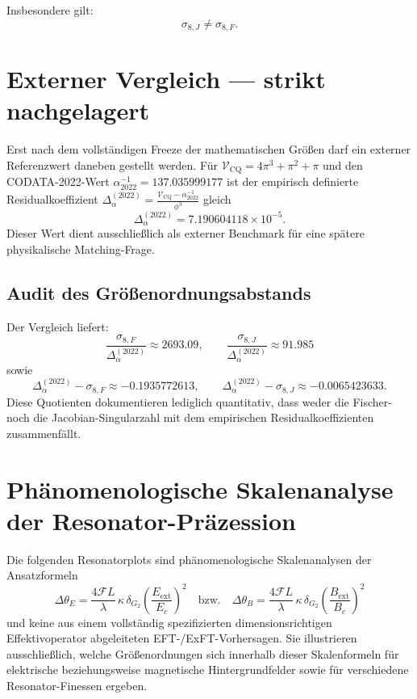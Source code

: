 \documentclass[11pt,a4paper]{article}
\begin{document}
Insbesondere gilt:
$$\boxed{ \sigma_{8,J} \neq \sigma_{8,F}. }$$

\section{Externer Vergleich — strikt nachgelagert}

Erst nach dem vollständigen Freeze der mathematischen Größen darf ein externer Referenzwert daneben gestellt werden. Für $\mathcal{V}_{\mathrm{CQ}} = 4\pi^3 + \pi^2 + \pi$ und den CODATA-2022-Wert $\alpha_{2022}^{-1} = 137.035999177$ ist der empirisch definierte Residualkoeffizient $\Delta_\alpha^{(2022)} = \frac{\mathcal{V}_{\mathrm{CQ}} - \alpha_{2022}^{-1}}{\phi^3}$ gleich
$$\boxed{ \Delta_\alpha^{(2022)} = 7.190604118 \times 10^{-5}. }$$
Dieser Wert dient ausschließlich als externer Benchmark für eine spätere physikalische Matching-Frage.

\subsection*{Audit des Größenordnungsabstands}
Der Vergleich liefert:
$$\frac{\sigma_{8,F}}{\Delta_\alpha^{(2022)}} \approx 2693.09, \qquad \frac{\sigma_{8,J}}{\Delta_\alpha^{(2022)}} \approx 91.985$$
sowie
$$\Delta_\alpha^{(2022)} - \sigma_{8,F} \approx -0.1935772613, \qquad \Delta_\alpha^{(2022)} - \sigma_{8,J} \approx -0.0065423633.$$
Diese Quotienten dokumentieren lediglich quantitativ, dass weder die Fischer- noch die Jacobian-Singularzahl mit dem empirischen Residualkoeffizienten zusammenfällt.

\section{Phänomenologische Skalenanalyse der Resonator-Präzession}

Die folgenden Resonatorplots sind phänomenologische Skalenanalysen der Ansatzformeln
$$\Delta\theta_E = \frac{4\mathcal{F}L}{\lambda} \, \kappa \, \delta_{G_2} \left(\frac{E_{\text{ext}}}{E_c}\right)^2 \quad \text{bzw.} \quad \Delta\theta_B = \frac{4\mathcal{F}L}{\lambda} \, \kappa \, \delta_{G_2} \left(\frac{B_{\text{ext}}}{B_c}\right)^2$$
und keine aus einem vollständig spezifizierten dimensionsrichtigen Effektivoperator abgeleiteten EFT-/ExFT-Vorhersagen. Sie illustrieren ausschließlich, welche Größenordnungen sich innerhalb dieser Skalenformeln für elektrische beziehungsweise magnetische Hintergrundfelder sowie für verschiedene Resonator-Finessen ergeben.
\end{document}
